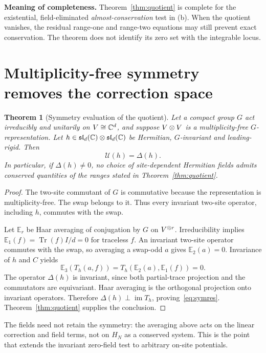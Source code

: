\documentclass[11pt,a4paper]{article}
\numberwithin{equation}{section}
\newtheorem{theorem}{Theorem}[section]
\theoremstyle{definition}\newtheorem{definition}[theorem]{Definition}
\theoremstyle{remark}\newtheorem{remark}[theorem]{Remark}
\DeclareMathOperator{\Tr}{Tr}\DeclareMathOperator{\rank}{rank}
\DeclareMathOperator{\im}{im}\DeclareMathOperator{\ad}{ad}
\newcommand{\g}{\mathfrak{sl}_d(\C)}\newcommand{\id}{\operatorname{id}}
\begin{document}
\textbf{Meaning of completeness.} Theorem~\ref{thm:quotient} is complete for the existential, field-eliminated \emph{almost-conservation} test in (b). When the quotient vanishes, the residual range-one and range-two equations may still prevent exact conservation. The theorem does not identify its zero set with the integrable locus.

\section{Multiplicity-free symmetry removes the correction space}\label{sec:symmetry}

\begin{theorem}[Symmetry evaluation of the quotient]\label{thm:symmetry}
Let a compact group $G$ act irreducibly and unitarily on $V\cong\mathbb C^d$, and suppose $V\otimes V$ is a multiplicity-free $G$-representation. Let $h\in\g\tens\g$ be Hermitian, $G$-invariant and leading-rigid. Then
\begin{equation}\label{eq:symres}
 \mathcal U(h)=\Delta(h).
\end{equation}
In particular, if $\Delta(h)\ne0$, no choice of site-dependent Hermitian fields admits conserved quantities of the ranges stated in Theorem~\ref{thm:quotient}.
\end{theorem}
\begin{proof}
The two-site commutant of $G$ is commutative because the representation is multiplicity-free. The swap belongs to it. Thus every invariant two-site operator, including $h$, commutes with the swap.

Let $\mathbb E_r$ be Haar averaging of conjugation by $G$ on $V^{\otimes r}$. Irreducibility implies $\mathbb E_1(f)=\Tr(f)I/d=0$ for traceless $f$. An invariant two-site operator commutes with the swap, so averaging a swap-odd $a$ gives $\mathbb E_2(a)=0$. Invariance of $h$ and $C$ yields
\[
 \mathbb E_3(T_h(a,f))=T_h(\mathbb E_2(a),\mathbb E_1(f))=0.
\]
The operator $\Delta(h)$ is invariant, since both partial-trace projection and the commutators are equivariant. Haar averaging is the orthogonal projection onto invariant operators. Therefore $\Delta(h)\perp\im T_h$, proving~\eqref{eq:symres}. Theorem~\ref{thm:quotient} supplies the conclusion.
\end{proof}

The fields need not retain the symmetry: the averaging above acts on the linear correction and field terms, not on $H_N$ as a conserved system. This is the point that extends the invariant zero-field test to arbitrary on-site potentials.
\end{document}
